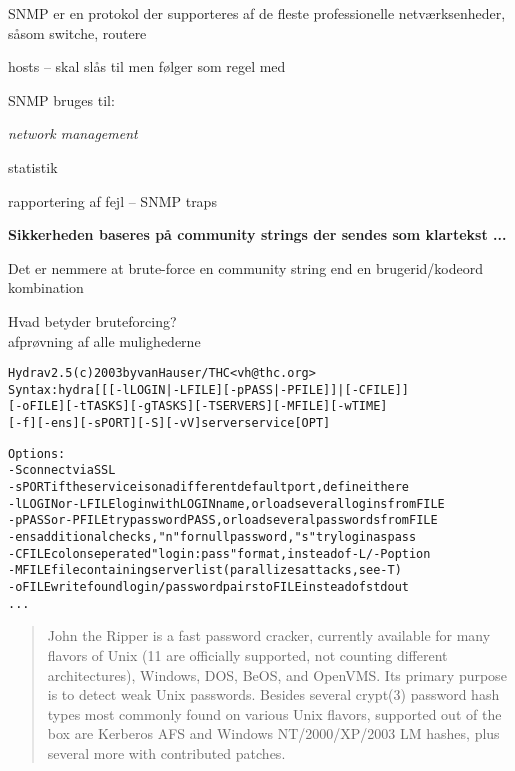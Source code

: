 \documentclass[20pt,landscape,a4paper,footrule]{foils}
\begin{document}
\begin{list1}
\item SNMP er en protokol der supporteres af de fleste professionelle
  netværksenheder, såsom switche, routere
\item hosts -- skal slås til men følger som regel med
\item SNMP bruges til:
  \begin{list2}
    \item \emph{network management}
    \item statistik
    \item rapportering af fejl -- SNMP traps
  \end{list2}
\item {\bfseries Sikkerheden baseres på community strings der sendes
    som klartekst ...}
\item Det er nemmere at brute-force en community string end en
  brugerid/kodeord kombination
\end{list1}


\begin{list1}
\item Hvad betyder bruteforcing?\\
afprøvning af alle mulighederne
\end{list1}

\begin{alltt}
\small
Hydra v2.5 (c) 2003 by van Hauser / THC <vh@thc.org>
Syntax: hydra [[[-l LOGIN|-L FILE] [-p PASS|-P FILE]] | [-C FILE]]
[-o FILE] [-t TASKS] [-g TASKS] [-T SERVERS] [-M FILE] [-w TIME]
[-f] [-e ns] [-s PORT] [-S] [-vV] server service [OPT]

Options:
  -S        connect via SSL
  -s PORT   if the service is on a different default port, define it here
  -l LOGIN  or -L FILE login with LOGIN name, or load several logins from FILE
  -p PASS   or -P FILE try password PASS, or load several passwords from FILE
  -e ns     additional checks, "n" for null password, "s" try login as pass
  -C FILE   colon seperated "login:pass" format, instead of -L/-P option
  -M FILE   file containing server list (parallizes attacks, see -T)
  -o FILE   write found login/password pairs to FILE instead of stdout
...
\end{alltt}


\begin{quote}
John the Ripper is a fast password cracker, currently available for
many flavors of Unix (11 are officially supported, not counting
different architectures), Windows, DOS, BeOS, and OpenVMS. Its primary
purpose is to detect weak Unix passwords. Besides several crypt(3)
password hash types most commonly found on various Unix flavors,
supported out of the box are Kerberos AFS and Windows NT/2000/XP/2003
LM hashes, plus several more with contributed patches.
\end{quote}
\end{document}

